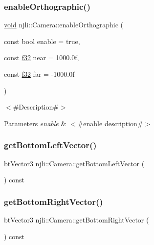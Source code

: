 \subsubsection{\texorpdfstring{enable\+Orthographic()}{enableOrthographic()}}
{\footnotesize\ttfamily \mbox{\hyperlink{_thread_8h_af1e856da2e658414cb2456cb6f7ebc66}{void}} njli\+::\+Camera\+::enable\+Orthographic (\begin{DoxyParamCaption}\item[{const bool}]{enable = {\ttfamily true},  }\item[{const \mbox{\hyperlink{_util_8h_a5f6906312a689f27d70e9d086649d3fd}{f32}}}]{near = {\ttfamily 1000.0f},  }\item[{const \mbox{\hyperlink{_util_8h_a5f6906312a689f27d70e9d086649d3fd}{f32}}}]{far = {\ttfamily -\/1000.0f} }\end{DoxyParamCaption})}

$<$\#\+Description\#$>$


\begin{DoxyParams}{Parameters}
{\em enable} & $<$\#enable description\#$>$ \\
\hline
\end{DoxyParams}
\mbox{\label{classnjli_1_1_camera_a08f8920fe8982d3c734298ef6f119c75}} 
\subsubsection{\texorpdfstring{get\+Bottom\+Left\+Vector()}{getBottomLeftVector()}}
{\footnotesize\ttfamily bt\+Vector3 njli\+::\+Camera\+::get\+Bottom\+Left\+Vector (\begin{DoxyParamCaption}{ }\end{DoxyParamCaption}) const\hspace{0.3cm}{\ttfamily [protected]}}

\mbox{\label{classnjli_1_1_camera_a86191e9e3772abe7bb18294d57ed77a7}} 
\subsubsection{\texorpdfstring{get\+Bottom\+Right\+Vector()}{getBottomRightVector()}}
{\footnotesize\ttfamily bt\+Vector3 njli\+::\+Camera\+::get\+Bottom\+Right\+Vector (\begin{DoxyParamCaption}{ }\end{DoxyParamCaption}) const\hspace{0.3cm}{\ttfamily [protected]}}

